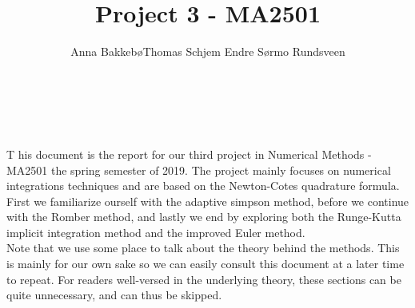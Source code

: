 \documentclass[12pt, a4paper,usenames,dvipsnames]{article}
\title{Project 3 - MA2501}
\author{Anna Bakkebø\And Thomas Schjem \And Endre Sørmo Rundsveen}
\begin{document}
\begin{titlepage}
  
    {\noindent \Huge {}}\\
    
    {\noindent\large \color{Brown}{Anna Bakkebø\\Thomas Schjem\\Endre Sørmo Rundsveen}}\\
    \raggedright
    \hfill \break
    \lettrine[lraise=0.15]{T}{} his document is the report for our third project in Numerical Methods - MA2501 the spring semester of 2019. The project mainly focuses on numerical integrations techniques and are based on the Newton-Cotes quadrature formula. First we familiarize ourself with the adaptive simpson method, before we continue with the Romber method, and lastly we end by exploring both the Runge-Kutta implicit integration method and the improved Euler method. \\ 
    \hspace{10pt}Note that we use some place to talk about the theory behind the methods. This is mainly for our own sake so we can easily consult this document at a later time to repeat. For readers well-versed in the underlying theory, these sections can be quite unnecessary, and can thus be skipped. 
\end{titlepage}
\restoregeometry
\twocolumn
\end{document}
